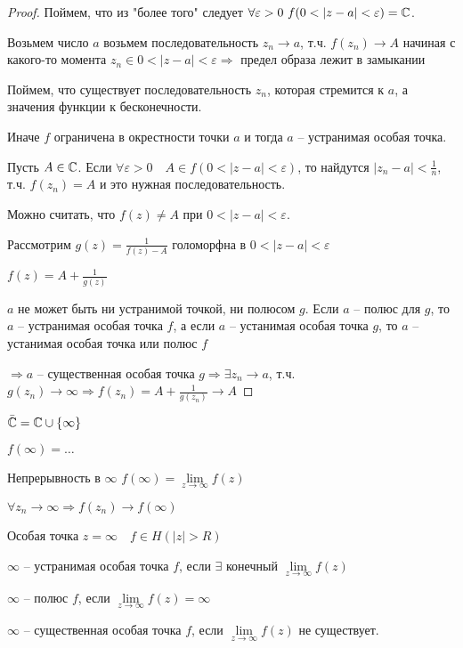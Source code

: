 \begin{proof}\thmslashn
	
	Поймем, что из "более того" следует $\forall \varepsilon > 0\,\,f ( 0< |z - a| < \varepsilon) = \mathbb{C}$.
	
	Возьмем число $a$ возьмем последовательность $z_n \to a$, т.ч. $f(z_n) \to A$ начиная с какого-то момента $z_n \in 0< |z - a| < \varepsilon \Rightarrow$ предел образа лежит в замыкании
	
	Поймем, что существует последовательность $z_n$, которая стремится к $a$, а значения функции к бесконечности.
	
	Иначе $f$ ограничена в окрестности точки $a$ и тогда $a$ -- устранимая особая точка.
	
	Пусть $A \in \mathbb{C}$. Если $\forall \varepsilon > 0\quad A \in f(0 < |z - a| < \varepsilon)$, то найдутся $|z_n-a| < \frac{1}{n}$, т.ч. $f(z_n) = A$ и это нужная последовательность.
	
	Можно считать, что $f(z) \not = A$ при $0 < |z - a| < \varepsilon$.
	
	Рассмотрим $g(z) = \frac{1}{f(z) - A}$ голоморфна в $0 < |z - a| < \varepsilon$
	
	$f(z) = A + \frac{1}{g(z)}$
	
	$a$ не может быть ни устранимой точкой, ни полюсом $g$. Если $a$ -- полюс для $g$, то $a$ -- устранимая особая точка $f$, а если $a$ -- устанимая особая точка $g$, то $a$ -- устанимая особая точка или полюс $f$
 	
 	$\Rightarrow a$ -- существенная особая точка $g \Rightarrow \exists z_n \to a$, т.ч. $g(z_n )\to \infty \Rightarrow f(z_n) = A + \frac{1}{g(z_n)} \to A$
 	
\end{proof}

\begin{designations}\thmslashn

	$\bar{\mathbb{C}} = \mathbb{C} \cup \{\infty\}$
	
	$f(\infty) = \ldots$
	
	Непрерывность в $\infty$ $f(\infty) = \lim\limits_{z \to \infty} f(z)$
	
	$\forall z_n \to \infty \Rightarrow f(z_n) \to f(\infty)$

\end{designations}

\begin{definition}\thmslashn
	
	Особая точка $z  = \infty \quad f\in H(|z| > R)$
	
	$\infty$ -- устранимая особая точка $f$, если $\exists$ конечный $\lim\limits_{z \to \infty} f(z)$
	
	$\infty$ -- полюс $f$, если $\lim\limits_{z \to \infty} f(z) = \infty$
	
	$\infty$ -- существенная особая точка $f$, если $\lim\limits_{z \to \infty} f(z)$ не существует.
	
\end{definition}

